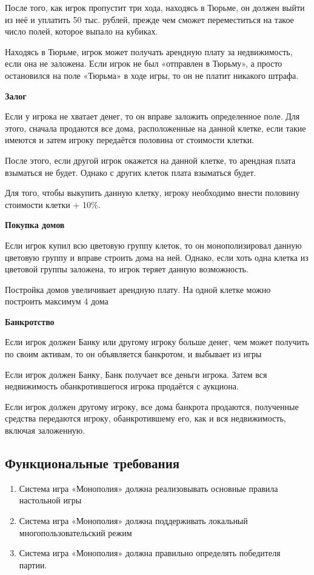 \begin{Large}
После того, как игрок пропустит три хода, находясь в Тюрьме, он должен выйти из неё и уплатить 50 тыс. рублей, прежде чем сможет переместиться на такое число полей, которое выпало на кубиках. 

Находясь в Тюрьме, игрок может получать арендную плату за недвижимость, если она не заложена. Если игрок не был «отправлен в Тюрьму», а просто остановился на поле «Тюрьма» в ходе игры, то он не платит никакого штрафа.

\textbf{Залог}

Если у игрока не хватает денег, то он вправе заложить определенное поле. Для этого, сначала продаются все дома, расположенные на данной клетке, если такие имеются и затем игроку передаётся половина от стоимости клетки. 

После этого, если другой игрок окажется на данной клетке, то арендная плата взыматься не будет. Однако с других клеток плата взыматься будет.

Для того, чтобы выкупить данную клетку, игроку необходимо внести половину стоимости клетки + 10\%.

\textbf{Покупка домов}

Если игрок купил всю цветовую группу клеток, то он монополизировал данную цветовую группу и вправе строить дома на ней. Однако, если хоть одна клетка из цветовой группы заложена, то игрок теряет данную возможность.

Постройка домов увеличивает арендную плату. На одной клетке можно построить максимум 4 дома

\textbf{Банкротство}

Если игрок должен Банку или другому игроку больше денег, чем может получить по своим активам, то он объявляется банкротом, и выбывает из игры

Если игрок должен Банку, Банк получает все деньги игрока. Затем вся недвижимость обанкротившегося игрока продаётся с аукциона.

Если игрок должен другому игроку, все дома банкрота продаются, полученные средства передаются игроку, обанкротившему его, как и вся недвижимость, включая заложенную.
\subsection{Функциональные требования}
\begin{spacing}{0.9}
\begin{enumerate}
    \item Система игра «Монополия» должна реализовывать основные правила настольной игры 
    \item Система игра «Монополия» должна поддерживать локальный многопользовательский режим
    \item Система игра «Монополия» должна правильно определять победителя партии.
\end{enumerate}
\end{spacing}

\end{Large}
